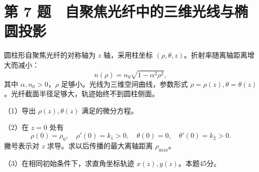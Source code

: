 \documentclass[12pt,a4paper,fontset=fandol]{ctexart}
\begin{document}
\section{第 7
题　自聚焦光纤中的三维光线与椭圆投影}\label{ux7b2c-7-ux9898-ux81eaux805aux7126ux5149ux7ea4ux4e2dux7684ux4e09ux7ef4ux5149ux7ebfux4e0eux692dux5706ux6295ux5f71}

圆柱形自聚焦光纤的对称轴为 \(z\) 轴，采用柱坐标
\((\rho,\theta,z)\)。折射率随离轴距离增大而减小： \[
n(\rho)=n_0\sqrt{1-\alpha^2\rho^2},
\] 其中 \(\alpha,n_0>0\)，\(\rho\) 足够小。光线为三维空间曲线，参数形式
\(\rho=\rho(z),\theta=\theta(z)\)。光纤截面半径足够大，轨迹始终不到圆柱侧面。

（1）导出 \(\rho(z),\theta(z)\) 满足的微分方程。

（2）在 \(z=0\) 处有 \[
\rho(0)=\rho_0,\quad \rho'(0)=k_1>0,\quad
\theta(0)=0,\quad\theta'(0)=k_2>0.
\] 撇号表示对 \(z\) 求导。求以后传播的最大离轴距离 \(\rho_{\max}\)。

（3）在相同初始条件下，求直角坐标轨迹 \(x(z),y(z)\)。本题45分。

\begin{center}
\begin{minipage}{\linewidth}
\centering\begingroup
{}
\ifdim\wd\diagrambox>.88\linewidth
\sbox{\diagrambox}{\resizebox{.88\linewidth}{!}{\usebox{\diagrambox}}}
\fi
\ifdim\ht\diagrambox>.40\textheight
\resizebox{!}{.40\textheight}{\usebox{\diagrambox}}
\else\usebox{\diagrambox}\fi
\par{}
\endgroup\end{minipage}
\end{center}
\end{document}

